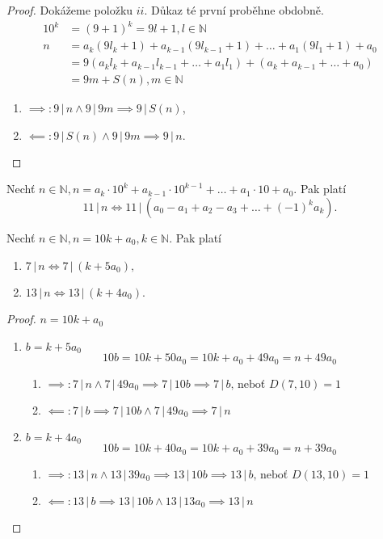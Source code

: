 \begin{proof}
  Dokážeme položku $ii$. Důkaz té první proběhne obdobně.
  \begin{align*}
    10^k & = (9+1)^k = 9l+1, l \in \mathbb N \\
    n & = a_k(9l_k+1)+a_{k-1}(9l_{k-1}+1)+\dots + a_1(9l_1+1)+a_0 \\
      & = 9(a_kl_k+a_{k-1}l_{k-1}+\dots+a_1l_1)+(a_k+a_{k-1}+\dots+a_0) \\
      & = 9m+S(n), m \in \mathbb N
  \end{align*}
  \begin{enumerate}
    \item $\implies: 9 \, | \, n \land 9 \, | \, 9m \implies 9 \, | \, S(n)$,
    \item $\impliedby: 9 \, | \, S(n) \land 9 \, | \, 9m \implies 9 \, | \, n.$ \qedhere
  \end{enumerate}
\end{proof}

\begin{veta}
  Nechť $n\in \mathbb N, n=a_k\cdot 10^k + a_{k-1}\cdot 10^{k-1}+\dots+a_1\cdot 10+ a_0$. Pak platí
  \[
    11 \, | \, n \iff 11 \, | \, (a_0-a_1+a_2-a_3+\dots+(-1)^k a_k).
  \]
\end{veta}

\begin{veta}
  Nechť $n\in \mathbb N, n=10k+a_0,k\in \mathbb N.$ Pak platí
  \begin{enumerate}[$i.$]
    \item $7 \, | \, n \iff 7 \, | \, (k+5a_0),$
    \item $13 \, | \, n \iff 13 \, | \, (k+4a_0) $.
  \end{enumerate}
\end{veta}

\begin{proof}
  $n=10k+a_0$
  \begin{enumerate}[$i.$]
    \item $b=k+5a_0$
      \[
        10b=10k+50a_0=10k+a_0+49a_0=n+49a_0
      \]
      \begin{enumerate}
        \item $\implies: 7 \, | \, n \land 7 \, | \, 49a_0 \implies 7 \, | \, 10b \implies 7 \, | \, b \textrm{, neboť } D(7,10)=1$
        \item $\impliedby: 7 \, | \, b \implies 7 \, | \, 10 b \land 7 \, | \, 49 a_0 \implies 7 \, | \, n$
      \end{enumerate}
    \item $b=k+4a_0$
      \[
        10b=10k+40a_0=10k+a_0+39a_0=n+39a_0
      \]
      \begin{enumerate}
        \item $\implies: 13 \, | \, n \land 13 \, | \, 39a_0 \implies 13 \, | \, 10b \implies 13 \, | \, b \textrm{, neboť } D(13,10)=1$
        \item $\impliedby: 13 \, | \, b \implies  13 \, | \, 10 b \land 13 \, | \, 13a_0 \implies 13 \, | \, n$ \qedhere
      \end{enumerate}
  \end{enumerate}
\end{proof}

